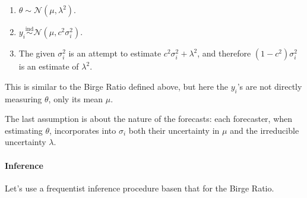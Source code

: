 \documentclass[12pt]{article}
\begin{document}
\begin{enumerate}
\item
  $\theta\sim \mathcal{N}(\mu,\lambda^2)$.
\item
  $y_i\overset{\mathrm{ind}}{\sim}\mathcal{N}(\mu,c^2\sigma_i^2)$.
\item
  The given $\sigma_i^2$ is an attempt to estimate $c^2\sigma_i^2+\lambda^2$, and therefore $(1-c^2)\sigma_i^2$ is an estimate of $\lambda^2$.
\end{enumerate}

This is similar to the Birge Ratio defined above, but here the $y_i$'s are not directly measuring $\theta$, only its mean $\mu$.

The last assumption is about the nature of the forecasts: each forecaster, when estimating $\theta$, incorporates into $\sigma_i$ both their uncertainty in $\mu$ and the irreducible uncertainty $\lambda$.

\paragraph{Inference}\label{inference-7}

Let's use a frequentist inference procedure basen that for the Birge Ratio.
\end{document}

